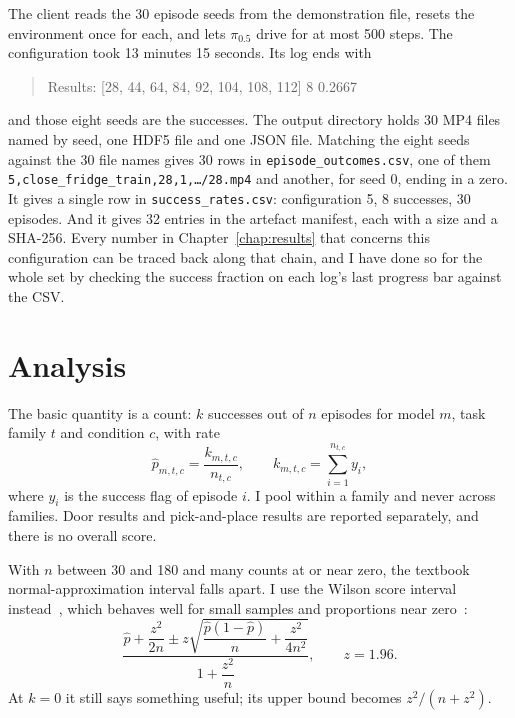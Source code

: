 The client reads the 30 episode seeds from the demonstration file, resets the environment once for each, and lets $\pi_{0.5}$ drive for at most 500 steps. The configuration took 13 minutes 15 seconds. Its log ends with
\begin{quote}\small\ttfamily\raggedright
Results: [28, 44, 64, 84, 92, 104, 108, 112] 8 0.2667
\end{quote}
and those eight seeds are the successes. The output directory holds 30 MP4 files named by seed, one HDF5 file and one JSON file. Matching the eight seeds against the 30 file names gives 30 rows in \texttt{episode\_outcomes.csv}, one of them \texttt{5,close\_fridge\_train,28,1,\ldots/28.mp4} and another, for seed 0, ending in a zero. It gives a single row in \texttt{success\_rates.csv}: configuration 5, 8 successes, 30 episodes. And it gives 32 entries in the artefact manifest, each with a size and a SHA-256. Every number in Chapter~\ref{chap:results} that concerns this configuration can be traced back along that chain, and I have done so for the whole set by checking the success fraction on each log's last progress bar against the CSV.

\section{Analysis}
\label{sec:analysis}

The basic quantity is a count: $k$ successes out of $n$ episodes for model $m$, task family $t$ and condition $c$, with rate
\begin{equation}
  \hat{p}_{m,t,c} = \frac{k_{m,t,c}}{n_{t,c}}, \qquad
  k_{m,t,c} = \sum_{i=1}^{n_{t,c}} y_i ,
  \label{eq:rate}
\end{equation}
where $y_i$ is the success flag of episode $i$. I pool within a family and never across families. Door results and pick-and-place results are reported separately, and there is no overall score.

With $n$ between 30 and 180 and many counts at or near zero, the textbook normal-approximation interval falls apart. I use the Wilson score interval instead~\cite{wilson1927probable}, which behaves well for small samples and proportions near zero~\cite{brown2001interval}:
\begin{equation}
  \frac{\hat{p} + \dfrac{z^2}{2n} \pm z\sqrt{\dfrac{\hat{p}(1-\hat{p})}{n} + \dfrac{z^2}{4n^2}}}{1 + \dfrac{z^2}{n}}, \qquad z = 1.96.
  \label{eq:wilson}
\end{equation}
At $k=0$ it still says something useful; its upper bound becomes $z^2/(n+z^2)$.

